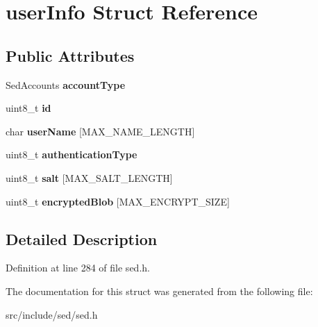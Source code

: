 \hypertarget{structuserInfo}{}\section{user\+Info Struct Reference}
\label{structuserInfo}
\subsection*{Public Attributes}
\begin{DoxyCompactItemize}
\item 
\hypertarget{structuserInfo_a208026609e540cf2243cb4ce3e2a3989}{}Sed\+Accounts {\bfseries account\+Type}\label{structuserInfo_a208026609e540cf2243cb4ce3e2a3989}

\item 
\hypertarget{structuserInfo_aebfa1c3383203334f8b4d9dcced15d31}{}uint8\+\_\+t {\bfseries id}\label{structuserInfo_aebfa1c3383203334f8b4d9dcced15d31}

\item 
\hypertarget{structuserInfo_ab1d31da5b9e92721b4a5b74b30cc51e8}{}char {\bfseries user\+Name} \mbox{[}M\+A\+X\+\_\+\+N\+A\+M\+E\+\_\+\+L\+E\+N\+G\+T\+H\mbox{]}\label{structuserInfo_ab1d31da5b9e92721b4a5b74b30cc51e8}

\item 
\hypertarget{structuserInfo_a621154a3e58dda466717fabb72be88fe}{}uint8\+\_\+t {\bfseries authentication\+Type}\label{structuserInfo_a621154a3e58dda466717fabb72be88fe}

\item 
\hypertarget{structuserInfo_a8cd35eb4d7b047ca412f825af3006fd1}{}uint8\+\_\+t {\bfseries salt} \mbox{[}M\+A\+X\+\_\+\+S\+A\+L\+T\+\_\+\+L\+E\+N\+G\+T\+H\mbox{]}\label{structuserInfo_a8cd35eb4d7b047ca412f825af3006fd1}

\item 
\hypertarget{structuserInfo_a5b5feb25f9670bc55290e9a770455e59}{}uint8\+\_\+t {\bfseries encrypted\+Blob} \mbox{[}M\+A\+X\+\_\+\+E\+N\+C\+R\+Y\+P\+T\+\_\+\+S\+I\+Z\+E\mbox{]}\label{structuserInfo_a5b5feb25f9670bc55290e9a770455e59}

\end{DoxyCompactItemize}


\subsection{Detailed Description}


Definition at line 284 of file sed.\+h.



The documentation for this struct was generated from the following file\+:\begin{DoxyCompactItemize}
\item 
src/include/sed/sed.\+h\end{DoxyCompactItemize}

